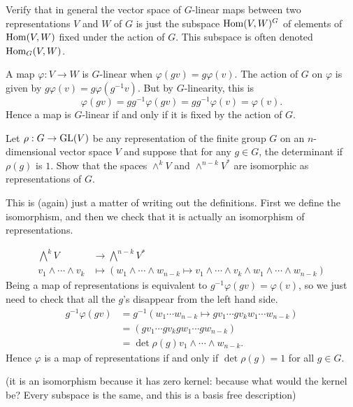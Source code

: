 \documentclass[11pt, english]{article}
\begin{document}
\begin{exc}[Exercise 1.2]
Verify that in general the vector space of $G$-linear maps between two representations $V$ and $W$ of $G$ is just the subspace $\operatorname{Hom}(V,W)^G$ of elements of $\operatorname{Hom}(V,W)$ fixed under the action of $G$. This subspace is often denoted $\operatorname{Hom}_G(V,W)$.
\end{exc}
\begin{sol}	
A map $\varphi:V \to W$ is $G$-linear when $\varphi(gv)=g \varphi(v)$. The action of $G$ on $\varphi$ is given by $g\varphi(v)=g \varphi(g^{-1}v)$. But by $G$-linearity, this is
$$
\varphi(gv)=g g^{-1} \varphi(gv)=gg^{-1}\varphi(v)=\varphi(v).
$$
Hence a map is $G$-linear if and only if it is fixed by the action of $G$. 
\end{sol}

\begin{exc}[Exercise 1.3]
Let $\rho:G \to \operatorname{GL}(V)$ be any representation of the finite group $G$ on an $n$-dimensional vector space $V$ and suppose that for any $g \in G$, the determinant if $\rho(g)$ is $1$. Show that the spaces $\wedge^k V $ and $\wedge^{n-k} V^\ast$ are isomorphic as representations of $G$.
\end{exc}

\begin{sol}
This is (again) just a matter of writing out the definitions. First we define the isomorphism, and then we check that it is actually an isomorphism of representations.

\begin{align*}
\bigwedge ^k V &\to \bigwedge^{n-k} V^\ast \\
v_1 \wedge \cdots \wedge v_k &\mapsto \left( w_1 \wedge \cdots \wedge w_{n-k} \mapsto v_1 \wedge \cdots \wedge v_k \wedge w_1 \wedge \cdots \wedge w_{n-k} \right)
\end{align*}
Being a map of representations is equivalent to $g^{-1}\varphi(gv)=\varphi(v)$, so we just need to check that all the $g$'s disappear from the left hand side. 
\begin{align*}
g^{-1}\varphi(gv) &= g^{-1}(w_1\cdots w_{n-k} \mapsto gv_1\cdots gv_k w_1 \cdots w_{n-k}) \\
&= (gv_1\cdots gv_k gw_1 \cdots gw_{n-k}) \\
&= \det \rho(g) v_1 \wedge \cdots \wedge w_{n-k}.
\end{align*}
Hence $\varphi$ is a map of representations if and only if $\det \rho(g)=1$ for all $g \in G$. 

(it is an isomorphism because it has zero kernel: because what would the kernel be? Every subspace is the same, and this is a basis free description)
\end{sol}
\end{document}
